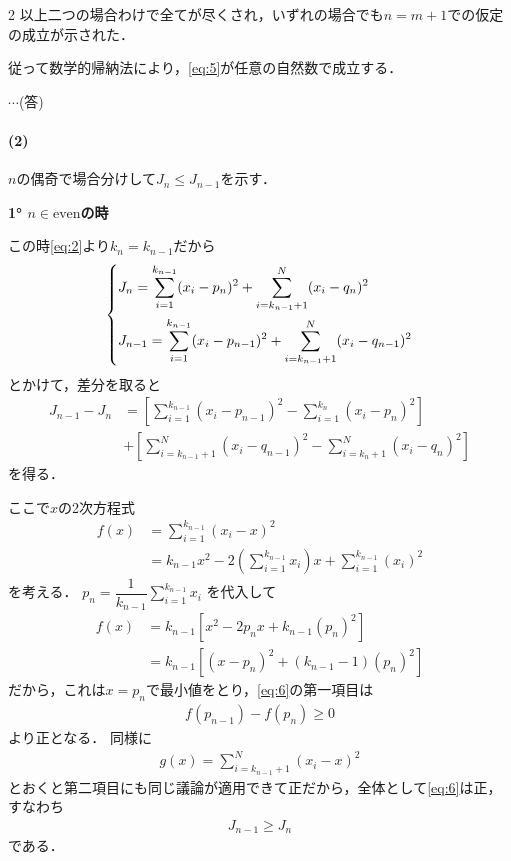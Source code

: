 \documentclass[../../main.tex]{subfiles}
\begin{document}
\begin{multicols}{2}
  以上二つの場合わけで全てが尽くされ，いずれの場合でも$n=m+1$での仮定の成立が示された．

  従って数学的帰納法により，\cref{eq:5}が任意の自然数で成立する．

  $\cdots$(答)

  \paragraph{(2)}
  $n$の偶奇で場合分けして$J_n \le J_{n-1}$を示す．

  \textbf{1° $n \in \text{even}$の時}

  この時\cref{eq:2}より$k_n = k_{n-1}$だから
  \begin{align}
    \begin{dcases}
      J_n     = \sum_{i=1}^{k_{n-1}} (x_i-p_n)^2     + \sum_{i=k_{n-1}+1}^{N} (x_i-q_n)^2 \\
      J_{n-1} = \sum_{i=1}^{k_{n-1}} (x_i-p_{n-1})^2 + \sum_{i=k_{n-1}+1}^{N} (x_i-q_{n-1})^2
    \end{dcases}
  \end{align}
  とかけて，差分を取ると
  \begin{align}
    J_{n-1}-J_n
    & = \left[ \sum_{i=1}^{k_{n-1}} (x_i-p_{n-1})^2 - \sum_{i=1}^{k_n} (x_i-p_n)^2 \right]     \\
    & + \left[ \sum_{i=k_{n-1}+1}^{N} (x_i-q_{n-1})^2 - \sum_{i=k_n+1}^{N} (x_i-q_n)^2 \right]
    \label{eq:6}
  \end{align}
  を得る．

  ここで$x$の2次方程式
  \begin{align}
    f(x)
    & = \sum_{i=1}^{k_{n-1}} (x_i-x)^2                                                          \\
    & = k_{n-1}x^2 - 2 \left( \sum_{i=1}^{k_{n-1}} x_i \right) x + \sum_{i=1}^{k_{n-1}} (x_i)^2
  \end{align}
  を考える．
  $p_n = \dfrac{1}{k_{n-1}} \sum_{i=1}^{k_{n-1}} x_i$ を代入して
  \begin{align}
    f(x)
    & = k_{n-1}\left[x^2-2p_nx+k_{n-1}(p_{n})^2\right]      \\
    & = k_{n-1}\left[(x-p_n)^2+(k_{n-1}-1)(p_{n})^2 \right]
  \end{align}
  だから，これは$x=p_{n}$で最小値をとり，\cref{eq:6}の第一項目は
  \begin{align}
    f(p_{n-1})-f(p_{n}) \ge 0
  \end{align}
  より正となる．
  同様に
  \begin{align}
    g(x) = \sum_{i=k_{n-1}+1}^{N} (x_i-x)^2
  \end{align}
  とおくと第二項目にも同じ議論が適用できて正だから，全体として\cref{eq:6}は正，すなわち
  \begin{align}
    J_{n-1} \ge J_{n}
  \end{align}
  である．


\end{multicols}
\end{document}
